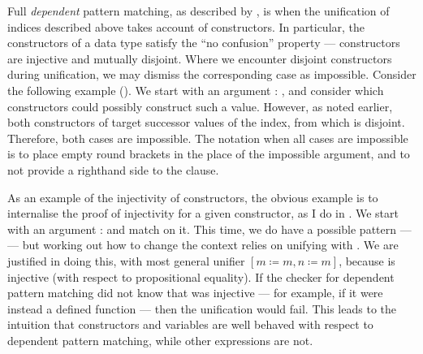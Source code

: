 Full \emph{dependent} pattern matching, as described by \citet{MM04}, is when
the unification of indices described above takes account of constructors.
In particular, the constructors of a data type satisfy the ``no confusion''
property --- constructors are injective and mutually disjoint.
Where we encounter disjoint constructors during unification, we may dismiss the
corresponding case as impossible.
Consider the following example ().
We start with an argument
\AgdaSpace{}\AgdaSymbol:\AgdaSpace{}\AgdaSpace{}%
, and consider which constructors could possibly
construct such a value.
However, as noted earlier, both constructors of  target
successor values of the index, from which  is
disjoint.
Therefore, both cases are impossible.
The notation when all cases are impossible is to place empty round brackets
\AgdaSymbol{()} in the place of the impossible argument, and to not provide a
righthand side to the clause.


As an example of the injectivity of constructors, the obvious example is to
internalise the proof of injectivity for a given constructor, as I do in
.
We start with an argument
\AgdaSpace{}\AgdaSymbol:\AgdaSpace{}%
\AgdaSpace{}%
\AgdaSpace{}\AgdaOperator{\AgdaDatatype{$\equiv$}}\AgdaSpace{}%
\AgdaSpace{}
and match on it.
This time, we do have a possible pattern ---  ---
but working out how to change the context relies on unifying
\AgdaSpace{} with
\AgdaSpace{}.
We are justified in doing this, with most general unifier
$[m \coloneqq m, n \coloneqq m]$, because  is
injective (with respect to propositional equality).
If the checker for dependent pattern matching did not know that
 was injective --- for example, if it were instead
a defined function --- then the unification would fail.
This leads to the intuition that constructors and variables are well behaved
with respect to dependent pattern matching, while other expressions are not.


